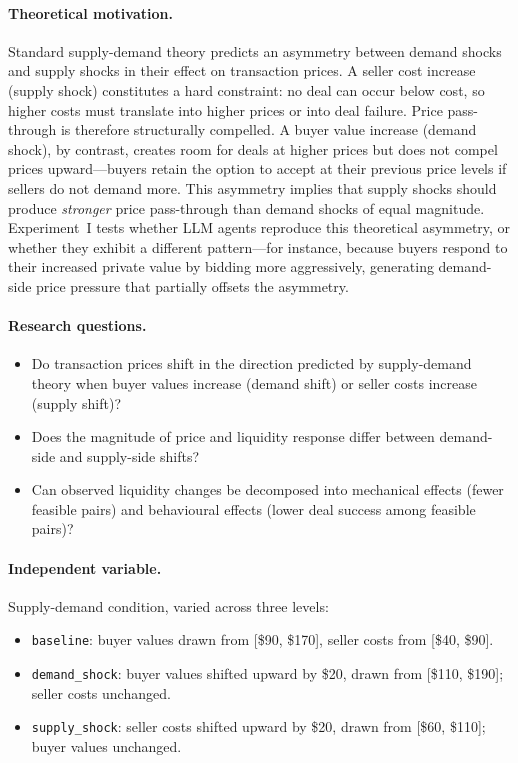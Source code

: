 \paragraph{Theoretical motivation.}
Standard supply-demand theory predicts an asymmetry between demand shocks and supply shocks in their effect on transaction prices.  A seller cost increase (supply shock) constitutes a hard constraint: no deal can occur below cost, so higher costs must translate into higher prices or into deal failure.  Price pass-through is therefore structurally compelled.  A buyer value increase (demand shock), by contrast, creates room for deals at higher prices but does not compel prices upward---buyers retain the option to accept at their previous price levels if sellers do not demand more.  This asymmetry implies that supply shocks should produce \emph{stronger} price pass-through than demand shocks of equal magnitude.  Experiment~I tests whether LLM agents reproduce this theoretical asymmetry, or whether they exhibit a different pattern---for instance, because buyers respond to their increased private value by bidding more aggressively, generating demand-side price pressure that partially offsets the asymmetry.

\paragraph{Research questions.}
\begin{itemize}
    \item[\textbf{RQ-I1.}] Do transaction prices shift in the direction predicted by supply-demand theory when buyer values increase (demand shift) or seller costs increase (supply shift)?
    \item[\textbf{RQ-I2.}] Does the magnitude of price and liquidity response differ between demand-side and supply-side shifts?
    \item[\textbf{RQ-I3.}] Can observed liquidity changes be decomposed into mechanical effects (fewer feasible pairs) and behavioural effects (lower deal success among feasible pairs)?
\end{itemize}

\paragraph{Independent variable.}
Supply-demand condition, varied across three levels:

\begin{itemize}
    \item \texttt{baseline}: buyer values drawn from [\$90, \$170], seller costs from [\$40, \$90].
    \item \texttt{demand\_shock}: buyer values shifted upward by \$20, drawn from [\$110, \$190]; seller costs unchanged.
    \item \texttt{supply\_shock}: seller costs shifted upward by \$20, drawn from [\$60, \$110]; buyer values unchanged.
\end{itemize}

